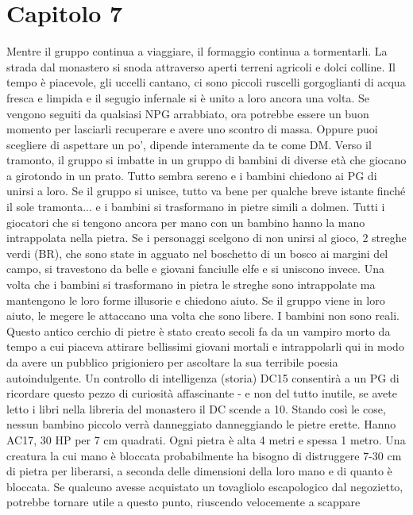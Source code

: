 \documentclass{article}
\begin{document}
\section{Capitolo 7}
Mentre il gruppo continua a viaggiare, il formaggio continua a tormentarli.
La strada dal monastero si snoda attraverso aperti terreni agricoli e dolci colline. Il tempo è piacevole, gli uccelli cantano, ci sono piccoli ruscelli gorgoglianti di acqua fresca e limpida e il segugio infernale si è unito a loro ancora una volta.
Se vengono seguiti da qualsiasi NPG arrabbiato, ora potrebbe essere un buon momento per lasciarli recuperare e avere uno scontro di massa. Oppure puoi scegliere di aspettare un po', dipende interamente da te come DM.
Verso il tramonto, il gruppo si imbatte in un gruppo di bambini di diverse età che giocano a girotondo in un prato.
Tutto sembra sereno e i bambini chiedono ai PG di unirsi a loro.
Se il gruppo si unisce, tutto va bene per qualche breve istante finché il sole tramonta... e i bambini si trasformano in pietre simili a dolmen. Tutti i giocatori che si tengono ancora per mano con un bambino hanno la mano intrappolata nella pietra.
Se i personaggi scelgono di non unirsi al gioco, 2 streghe verdi (BR), che sono state in agguato nel boschetto di un bosco ai margini del campo, si travestono da belle e giovani fanciulle elfe e si uniscono invece.
Una volta che i bambini si trasformano in pietra le streghe sono intrappolate ma mantengono le loro forme illusorie e chiedono aiuto. Se il gruppo viene in loro aiuto, le megere le attaccano una volta che sono libere.
I bambini non sono reali. Questo antico cerchio di pietre è stato creato secoli fa da un vampiro morto da tempo a cui piaceva attirare bellissimi giovani mortali e intrappolarli qui in modo da avere un pubblico prigioniero per ascoltare la sua terribile poesia autoindulgente. Un controllo di intelligenza (storia) DC15 consentirà a un PG di ricordare questo pezzo di curiosità affascinante - e non del tutto inutile, se avete letto i libri nella libreria del monastero il DC scende a 10.
Stando così le cose, nessun bambino piccolo verrà danneggiato danneggiando le pietre erette.
Hanno AC17, 30 HP per 7 cm quadrati. Ogni pietra è alta 4 metri e spessa 1 metro. Una creatura la cui mano è bloccata probabilmente ha bisogno di distruggere 7-30 cm di pietra per liberarsi, a seconda delle dimensioni della loro mano e di quanto è bloccata. Se qualcuno avesse acquistato un tovagliolo escapologico dal negozietto, potrebbe tornare utile a questo punto, riuscendo velocemente a scappare
\end{document}
